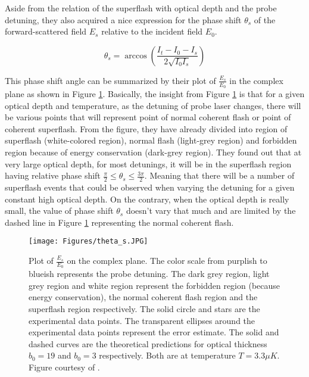 Aside from the relation of the superflash with optical depth and the probe detuning, they also acquired a nice expression for the phase shift $\theta_{s}$ of the forward-scattered field $E_{s}$ relative to the incident field $E_{0}$. 

\begin{equation}
    \theta_{s} = \arccos({\frac{I_{t} - I_{0} - I_{s}}{2 \sqrt{I_{0} I_{s}}}})
\end{equation}

This phase shift angle can be summarized by their plot of $\frac{E_{s}}{E_{0}}$ in the complex plane as shown in Figure \ref{fig: theta_s}. Basically, the insight from Figure \ref{fig: theta_s} is that for a given optical depth and temperature, as the detuning of probe laser changes, there will be various points that will represent point of normal coherent flash or point of coherent superflash. From the figure, they have already divided into region of superflash (white-colored region), normal flash (light-grey region) and forbidden region because of energy conservation (dark-grey region). They found out that at very large optical depth, for most detunings, it will be in the superflash region having relative phase shift $\frac{\pi}{2} \leq \theta_{s} \leq \frac{3\pi}{2}$. Meaning that there will be a number of superflash events that could be observed when varying the detuning for a given constant high optical depth. On the contrary, when the optical depth is really small, the value of phase shift $\theta_{s}$ doesn't vary that much and are limited by the dashed line in Figure \ref{fig: theta_s} representing the normal coherent flash.

\begin{figure}
    \centering
    \texttt{[image: Figures/theta\_s.JPG]}
    \caption[Plot of Normalized Forward-Scattered Field on Complex Plane]{Plot of $\frac{E_{s}}{E_{0}}$ on the complex plane. The color scale from purplish to blueish represents the probe detuning. The dark grey region, light grey region and white region represent the forbidden region (because energy conservation), the normal coherent flash region and the superflash region respectively. The solid circle and stars are the experimental data points. The transparent ellipses around the experimental data points represent the error estimate. The solid and dashed curves are the theoretical predictions for optical thickness $b_{0} = 19$ and $b_{0} = 3$ respectively. Both are at temperature $T = 3.3\mu K$. Figure courtesy of \protect{}.}
    \label{fig: theta_s}
\end{figure}


